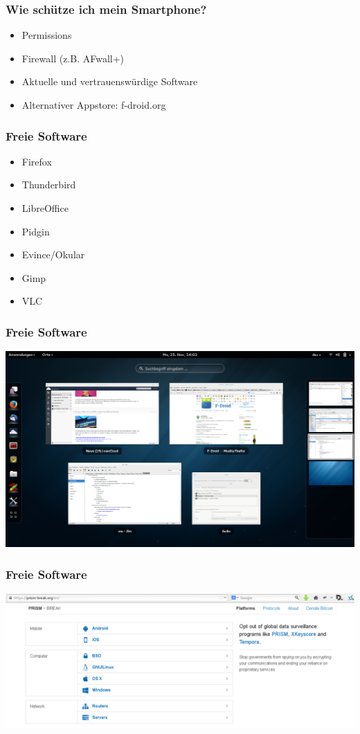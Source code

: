 \documentclass[12pt]{beamer}
\begin{document}
\begin{frame}
    \frametitle{Wie schütze ich mein Smartphone?}
    \begin{itemize}
      \item Permissions
      \item Firewall (z.B. AFwall+)
      \item Aktuelle und vertrauenswürdige Software
      \item Alternativer Appstore: f-droid.org
    \end{itemize}
\end{frame}

\begin{frame}
    \frametitle{Freie Software}
    \begin{itemize}
      \item Firefox
      \item Thunderbird
      \item LibreOffice
      \item Pidgin
      \item Evince/Okular
      \item Gimp
      \item VLC
    \end{itemize}
\end{frame}

\begin{frame}
    \frametitle{Freie Software}
    \includegraphics[height=0.7\textheight]{img/gnome.png}
\end{frame}

\begin{frame}
    \frametitle{Freie Software}
    \includegraphics[height=0.7\textheight]{img/prism-break1.png}
\end{frame}
\end{document}
